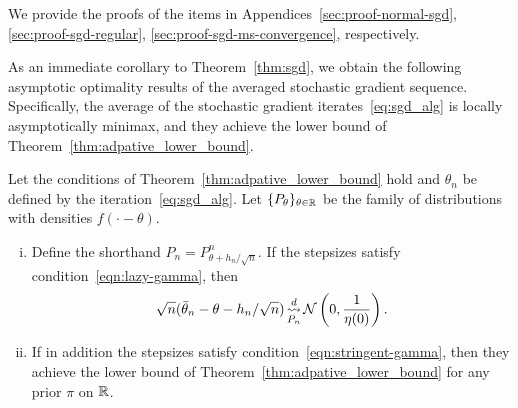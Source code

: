 \noindent
We provide the proofs of the items in Appendices~\ref{sec:proof-normal-sgd},
\ref{sec:proof-sgd-regular}, \ref{sec:proof-sgd-ms-convergence},
respectively.

As an immediate corollary to Theorem~\ref{thm:sgd}, we obtain the following
asymptotic optimality results of the averaged stochastic gradient
sequence. Specifically, the average of the stochastic gradient
iterates~\eqref{eq:sgd_alg}
is locally asymptotically minimax, and they achieve the lower
bound of Theorem~\ref{thm:adpative_lower_bound}.

\begin{corollary}
  Let the conditions of Theorem~\ref{thm:adpative_lower_bound} hold
  and $\theta_n$ be defined by the iteration~\eqref{eq:sgd_alg}.
  Let $\{P_\theta\}_{\theta \in \mathbb{R}}$ be the family of distributions
  with densities $f(\cdot - \theta)$.
  \begin{enumerate}[(i)]
  \item Define the shorthand $P_n = P_{\theta + h_n/\sqrt{n}}^n$.
    If the stepsizes satisfy condition~\eqref{eqn:lazy-gamma}, then
    \begin{equation*}
      \sqrt{n}(\bar{\theta}_n - \theta - h_n / \sqrt{n})
      \mathop{\stackrel{d}{\rightsquigarrow}}_{P_n} \mathcal{N}\left(0, \frac{1}{\eta(0)}\right).
    \end{equation*}
  \item If in addition the stepsizes satisfy
    condition~\eqref{eqn:stringent-gamma}, then they
    achieve the lower bound of Theorem~\ref{thm:adpative_lower_bound} for any
    prior $\pi$ on $\mathbb{R}$.
  \end{enumerate}
\end{corollary}

  


